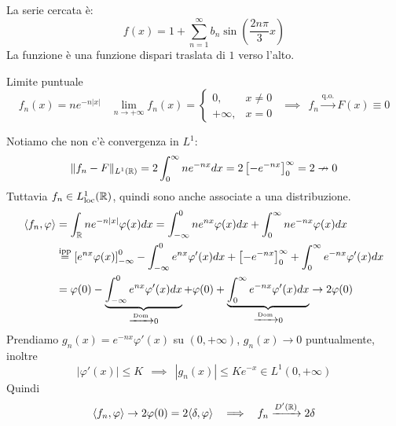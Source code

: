 La serie cercata è:
\begin{equation*}
f(x) = 1 + \sum^{\infty}_{n = 1} b_{n}\sin\left(\frac{2n\pi}{3} x\right)
\end{equation*}
La funzione è una funzione dispari traslata di $1$ verso l'alto.
\Soluzione

Limite puntuale
\begin{equation*}
f_{n} (x) = ne^{- n|x|} \ \ \ \ \lim\limits_{n\rightarrow + \infty} f_{n}(x) = 
\begin{cases}
0, & x\neq 0\\
+ \infty, & x = 0
\end{cases} \ \ \implies \ \ f_{n}\xrightarrow{\text{q.o.}} F(x) \equiv 0
\end{equation*}

Notiamo che non c'è convergenza in $L^{1}$:
\begin{equation*}
\Vert f_{n} - F\Vert_{L^{1}(\mathbb{R})} = 2\int^{\infty}_{0} ne^{- nx} dx = 2\left[ - e^{- nx}\right]^{\infty}_{0} = 2\nrightarrow 0
\end{equation*}
Tuttavia $f_{n} \in L^{1}_{\operatorname{loc}}(\mathbb{R})$, quindi sono anche associate a una distribuzione.
\begin{equation*}
\begin{aligned}
\langle f_{n}, \varphi \rangle  & = \int_{\mathbb{R}} ne^{- n| x|} \varphi (x) dx = \int^{0}_{- \infty} ne^{nx} \varphi (x) dx + \int^{\infty}_{0} ne^{- nx} \varphi (x) dx\\
 & \overset{\text{ipp}}{=}\left[ e^{nx} \varphi (x)\right]^{0}_{- \infty} - \int^{0}_{- \infty} e^{nx} \varphi '(x) dx + \left[ - e^{- nx}\right]^{\infty}_{0} + \int^{\infty}_{0} e^{- nx} \varphi '(x) dx\\
 & = \varphi (0) - \underbrace{\int^{0}_{- \infty} e^{nx} \varphi '(x) dx}_{\xrightarrow{\text{Dom}} 0} + \varphi (0) + \underbrace{\int^{\infty}_{0} e^{- nx} \varphi '(x) dx}_{\xrightarrow{\text{Dom}} 0}\rightarrow 2\varphi (0)
\end{aligned}
\end{equation*}
Prendiamo $g_{n}(x) = e^{- nx} \varphi '(x)$ su $(0, + \infty)$, $g_{n}(x)\rightarrow 0$ puntualmente, inoltre
\begin{equation*}
| \varphi '(x)| \leq K\ \ \implies \ \ | g_{n}(x)| \leq Ke^{- x} \in L^{1}(0, + \infty)
\end{equation*}
Quindi
\begin{equation*}
\langle f_{n}, \varphi \rangle \rightarrow 2\varphi (0) = 2\langle \delta, \varphi \rangle \ \ \implies \ \ f_{n}\xrightarrow{D'(\mathbb{R})} 2\delta 
\end{equation*}
\Soluzione

